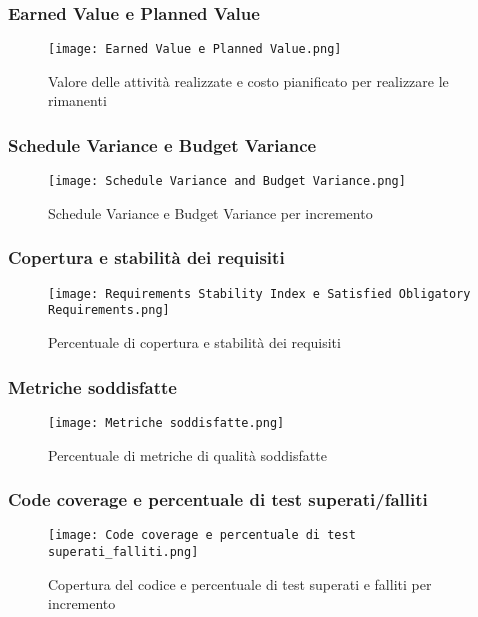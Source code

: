     \subsubsection{Earned Value e Planned Value}
    \begin{figure}[H]
      \centering
      \texttt{[image: Earned Value e Planned Value.png]}
      \caption{Valore delle attività realizzate e costo pianificato per realizzare le rimanenti}
    \end{figure}

    \subsubsection{Schedule Variance e Budget Variance}
    \begin{figure}[H]
      \centering
      \texttt{[image: Schedule Variance and Budget Variance.png]}
      \caption{Schedule Variance e Budget Variance per incremento}
    \end{figure}

    \subsubsection{Copertura e stabilità dei requisiti}
    \begin{figure}[H]
      \centering
      \texttt{[image: Requirements Stability Index e Satisfied Obligatory Requirements.png]}
      \caption{Percentuale di copertura e stabilità dei requisiti}
    \end{figure}

    \subsubsection{Metriche soddisfatte}
    \begin{figure}[H]
      \centering
      \texttt{[image: Metriche soddisfatte.png]}
      \caption{Percentuale di metriche di qualità soddisfatte}
    \end{figure}

    \subsubsection{Code coverage e percentuale di test superati/falliti}
    \begin{figure}[H]
      \centering
      \texttt{[image: Code coverage e percentuale di test superati\_falliti.png]}
      \caption{Copertura del codice e percentuale di test superati e falliti per incremento}
    \end{figure}
